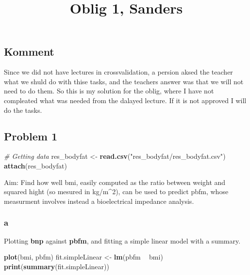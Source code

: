 \documentclass[
]{article}
\title{Oblig 1, Sanders}
\author{}
\date{\vspace{-2.5em}}
\newenvironment{Shaded}{\begin{snugshade}}{\end{snugshade}}
\newcommand{\CommentTok}[1]{\textcolor[rgb]{0.56,0.35,0.01}{\textit{#1}}}
\newcommand{\KeywordTok}[1]{\textcolor[rgb]{0.13,0.29,0.53}{\textbf{#1}}}
\newcommand{\NormalTok}[1]{#1}
\newcommand{\OperatorTok}[1]{\textcolor[rgb]{0.81,0.36,0.00}{\textbf{#1}}}
\newcommand{\StringTok}[1]{\textcolor[rgb]{0.31,0.60,0.02}{#1}}
\begin{document}
\maketitle

\hypertarget{komment}{%
\subsection{Komment}\label{komment}}

Since we did not have lectures in crossvalidation, a persion aksed the
teacher what we shuld do with thise tasks, and the teachers answer was
that we will not need to do them. So this is my solution for the oblig,
where I have not compleated what was needed from the dalayed lecture. If
it is not approved I will do the tasks.

\hypertarget{problem-1}{%
\subsection{Problem 1}\label{problem-1}}

\begin{Shaded}
\begin{Highlighting}[]
\CommentTok{# Getting data}
\NormalTok{res_bodyfat <-}\StringTok{ }\KeywordTok{read.csv}\NormalTok{(}\StringTok{"res_bodyfat/res_bodyfat.csv"}\NormalTok{)}
\KeywordTok{attach}\NormalTok{(res_bodyfat)}
\end{Highlighting}
\end{Shaded}

Aim: Find how well bmi, easily computed as the ratio between weight and
squared hight (so mesured in kg/m\^{}2), can be used to predict pbfm,
whose measurment involves instead a bioelectrical impedance analysis.

\hypertarget{a}{%
\subsubsection{a}\label{a}}

Plotting \textbf{bnp} against \textbf{pbfm}, and fitting a simple linear
model with a summary.

\begin{Shaded}
\begin{Highlighting}[]
\KeywordTok{plot}\NormalTok{(bmi, pbfm)}
\NormalTok{fit.simpleLinear <-}\StringTok{ }\KeywordTok{lm}\NormalTok{(pbfm }\OperatorTok{~}\StringTok{ }\NormalTok{bmi)}
\KeywordTok{print}\NormalTok{(}\KeywordTok{summary}\NormalTok{(fit.simpleLinear))}
\end{Highlighting}
\end{Shaded}
\end{document}
